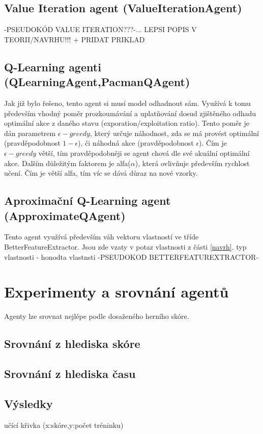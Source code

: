 \begin{enumerate}
\section{Value Iteration agent (ValueIterationAgent)}
-PSEUDOKÓD VALUE ITERATION???-... LEPSI POPIS V TEORII/NAVRHU!!! + PRIDAT PRIKLAD

\section{Q-Learning agenti (QLearningAgent,PacmanQAgent)}
Jak již bylo řešeno, tento agent si musí model odhadnout sám. Využívá k tomu především vhodný poměr prozkoumávání a uplatňování dosud zjištěného odhadu optimální akce z daného stavu (exporation/exploitation ratio). Tento poměr je dán parametrem $\epsilon-greedy$, který určuje náhodnost, zda se má provést optimální (pravděpodobnost $1-\epsilon$), či náhodná akce (pravděpodobnost $\epsilon$). Čím je $\epsilon-greedy$ větší, tím pravděpodobněji se agent chová dle své akuální optimální akce. Dalším důležitým faktorem je alfa($\alpha$), která ovlivňuje především rychlost učení. Čím je větší alfa, tím víc se dává důraz na nové vzorky.

\section{Aproximační Q-Learning agent (ApproximateQAgent)}
Tento agent využívá především váh vektoru vlastností ve tříde BetterFeatureExtractor. Jsou zde vzaty v potaz vlastnosti z části \ref{navrh}.
\newline
typ vlastnosti - honodta vlastnsti
-PSEUDOKOD BETTERFEATUREXTRACTOR-

\chapter{Experimenty a srovnání agentů}
Agenty lze srovnat nejlépe podle dosaženého herního skóre.
\section{Srovnání z hlediska skóre}
\section{Srovnání z hlediska času}
\section{Výsledky}
učící křivka (x:skóre,y:počet tréninku)


\end{enumerate}
